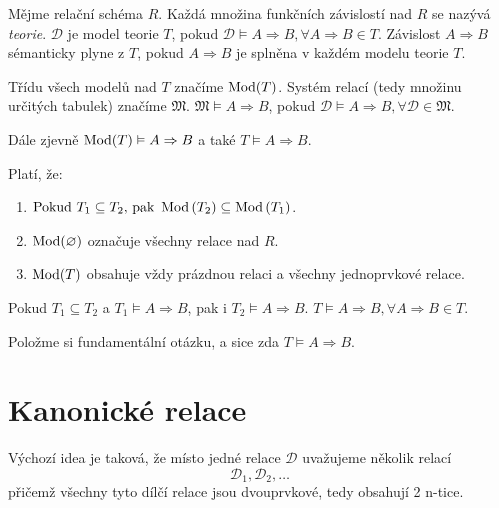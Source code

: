 \begin{uptheorem}
Mějme relační schéma $R$. Každá množina funkčních závislostí nad $R$ se nazývá \textit{teorie}. $\mathcal{D}$ je model teorie $T$, pokud $\mathcal{D} \vDash A \Rightarrow B, \forall A \Rightarrow B \in T$. Závislost $A \Rightarrow B$ sémanticky plyne z $T$, pokud $A \Rightarrow B$ je splněna v každém modelu teorie $T$.

Třídu všech modelů nad $T$ značíme $\operatorname{Mod}(T)$. Systém relací (tedy množinu určitých tabulek) značíme $\mathfrak{M}$. $\mathfrak{M} \vDash A \Rightarrow B$, pokud $\mathcal{D} \vDash A \Rightarrow B, \forall \mathcal{D} \in \mathfrak{M}$.

Dále zjevně $\operatorname{Mod}(T) \vDash A \Rightarrow B$ a také $T \vDash A \Rightarrow B$.
\end{uptheorem}
\begin{upquote}
Platí, že:
\begin{enumerate}
\item $\text{Pokud } T_{1} \subseteq T_{2} \text{, pak } \operatorname{Mod}\left( T_{2} \right) \subseteq \operatorname{Mod}\left( T_{1} \right)$.
\item $\operatorname{Mod}(\varnothing)$ označuje všechny relace nad $R$.
\item $\operatorname{Mod}(T)$ obsahuje vždy prázdnou relaci a všechny jednoprvkové relace.
\end{enumerate}
\end{upquote}
\begin{upquote}
Pokud $T_{1} \subseteq T_{2}$ a $T_{1} \vDash A \Rightarrow B$, pak i $T_{2} \vDash A \Rightarrow B$. $T \vDash A \Rightarrow B, \forall A \Rightarrow B \in T$.
\end{upquote}
Položme si fundamentální otázku, a sice zda $T \vDash A \Rightarrow B$.

\section{Kanonické relace}
Výchozí idea je taková, že místo jedné relace $\mathcal{D}$ uvažujeme několik relací
$$
\mathcal{D}_{1},\mathcal{D}_{2},\ldots
$$
přičemž všechny tyto dílčí relace jsou dvouprvkové, tedy obsahují 2 n-tice.

